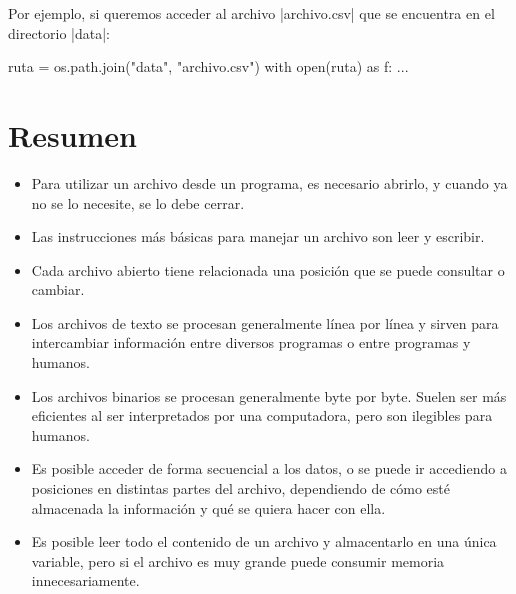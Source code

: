 Por ejemplo, si queremos acceder al archivo |archivo.csv| que se encuentra en
el directorio |data|:

\begin{codigo-python-sn}
ruta = os.path.join("data", "archivo.csv")
with open(ruta) as f:
    ...
\end{codigo-python-sn}

\section{Resumen}

\begin{itemize}
\item Para utilizar un archivo desde un programa, es necesario abrirlo, y
cuando ya no se lo necesite, se lo debe cerrar.
\item Las instrucciones más básicas para manejar un archivo son leer y escribir.
\item Cada archivo abierto tiene relacionada una posición que se puede
consultar o cambiar.
\item Los archivos de texto se procesan generalmente línea por línea y
sirven para intercambiar información entre diversos programas o entre
programas y humanos.
\item Los archivos binarios se procesan generalmente byte por byte. Suelen ser
más eficientes al ser interpretados por una computadora, pero son ilegibles
para humanos.
\item Es posible acceder de forma secuencial a los datos, o se puede ir
accediendo a posiciones en distintas partes del archivo, dependiendo de
cómo esté almacenada la información y qué se quiera hacer con ella.
\item Es posible leer todo el contenido de un archivo y almacentarlo en una
única variable, pero si el archivo es muy grande puede consumir memoria
innecesariamente.
\end{itemize}

